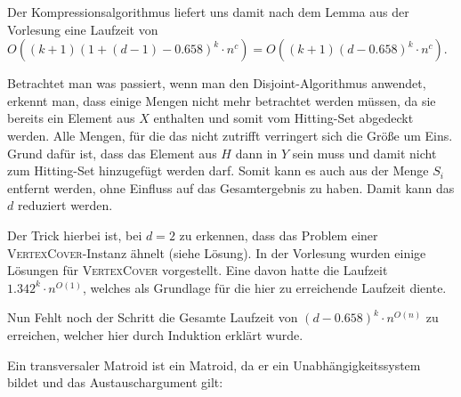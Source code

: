 Der Kompressionsalgorithmus liefert uns damit nach dem Lemma aus der Vorlesung eine Laufzeit von $O((k+1)(1+(d-1)-0.658)^k \cdot n^c) = O((k+1)(d-0.658)^k \cdot n^c)$.


\how
Betrachtet man was passiert, wenn man den Disjoint-Algorithmus anwendet, erkennt man, dass einige Mengen nicht mehr betrachtet werden müssen, da sie bereits ein Element aus $X$ enthalten und somit vom Hitting-Set abgedeckt werden. Alle Mengen, für die das nicht zutrifft verringert sich die Größe um Eins. Grund dafür ist, dass das Element aus $H$ dann in $Y$ sein muss und damit nicht zum Hitting-Set hinzugefügt werden darf. Somit kann es auch aus der Menge $S_i$ entfernt werden, ohne Einfluss auf das Gesamtergebnis zu haben. Damit kann das $d$ reduziert werden. 

Der Trick hierbei ist, bei $d=2$ zu erkennen, dass das Problem einer \textsc{VertexCover}-Instanz ähnelt (siehe Lösung). In der Vorlesung wurden einige Lösungen für \textsc{VertexCover} vorgestellt. Eine davon hatte die Laufzeit $1.342^k \cdot n^{O(1)}$, welches als Grundlage für die hier zu erreichende Laufzeit diente.

Nun Fehlt noch der Schritt die Gesamte Laufzeit von $(d-0.658)^k \cdot n^{O(n)}$ zu erreichen, welcher hier durch Induktion erklärt wurde.



\subexercise
Ein transversaler Matroid ist ein Matroid, da er ein Unabhängigkeitssystem bildet und das Austauschargument gilt:


